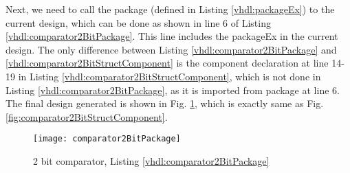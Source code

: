 

\begin{explanation}
	Next, we need to call the package (defined in Listing \ref{vhdl:packageEx}) to the current design, which can be done as shown in line 6 of Listing \ref{vhdl:comparator2BitPackage}. This line includes the packageEx in the current design. The only difference between Listing \ref{vhdl:comparator2BitPackage} and \ref{vhdl:comparator2BitStructComponent} is the component declaration at line 14-19 in Listing \ref{vhdl:comparator2BitStructComponent}, which is not done in Listing \ref{vhdl:comparator2BitPackage}, as it is imported from package at line 6. The final design generated is shown in Fig. \ref{fig:comparator2BitPackage}, which is exactly same as Fig. \ref{fig:comparator2BitStructComponent}. 
\end{explanation}

\begin{figure}
	\centering
	\texttt{[image: comparator2BitPackage]}
	\caption{2 bit comparator, Listing \ref{vhdl:comparator2BitPackage}}
	\label{fig:comparator2BitPackage}
\end{figure}
